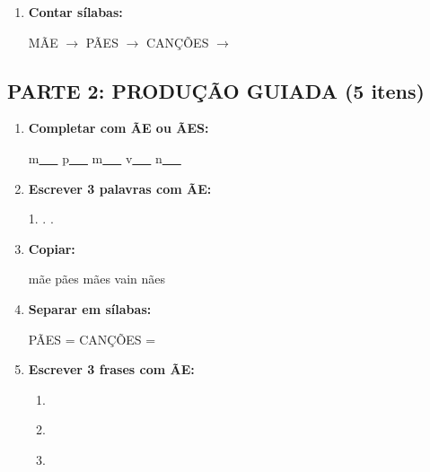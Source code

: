 \begin{exercicio}
\begin{enumerate}
  \item \textbf{Contar sílabas:}
  \begin{center}
  MÃE $\rightarrow$ \underline{\hspace{1cm}} \quad PÃES $\rightarrow$ \underline{\hspace{1cm}} \quad CANÇÕES $\rightarrow$ \underline{\hspace{1cm}}
  \end{center}
\end{enumerate}

\subsection*{PARTE 2: PRODUÇÃO GUIADA (5 itens)}

\begin{enumerate}[resume]
  \item \textbf{Completar com ÃE ou ÃES:}
  \begin{center}
  m\underline{~~~} \quad p\underline{~~~} \quad m\underline{~~~} \quad v\underline{~~~} \quad n\underline{~~~}
  \end{center}

  \item \textbf{Escrever 3 palavras com ÃE:}
  \begin{center}
  1. \underline{\hspace{3cm}} . \underline{\hspace{3cm}} . \underline{\hspace{3cm}}
  \end{center}

  \item \textbf{Copiar:}
  \begin{center}
  mãe \quad pães \quad mães \quad vain \quad nães
  \end{center}

  \item \textbf{Separar em sílabas:}
  \begin{center}
  PÃES = \underline{\hspace{1cm}} \underline{\hspace{1cm}} \quad CANÇÕES = \underline{\hspace{1cm}} \underline{\hspace{1cm}} \underline{\hspace{1cm}}
  \end{center}

  \item \textbf{Escrever 3 frases com ÃE:}
  \begin{enumerate}[label=\alph*)]
    \item \underline{\hspace{8cm}}
    \item \underline{\hspace{8cm}}
    \item \underline{\hspace{8cm}}
  \end{enumerate}
\end{enumerate}


\end{exercicio}
